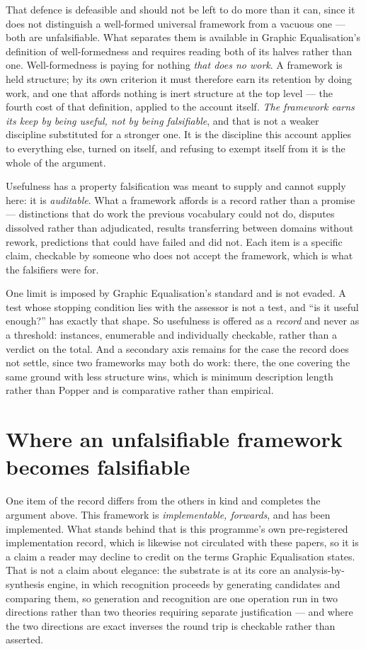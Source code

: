 \documentclass[11pt,a4paper]{article}
\begin{document}
That defence is defeasible and should not be left to do more than it can, since it does not
distinguish a well-formed universal framework from a vacuous one --- both are unfalsifiable. What
separates them is available in Graphic Equalisation's definition of well-formedness and requires reading both of its
halves rather than one. Well-formedness is paying for nothing \emph{that does no work}. A framework is
held structure; by its own criterion it must therefore earn its retention by doing work, and one that
affords nothing is inert structure at the top level --- the fourth cost of that definition, applied to
the account itself. \emph{The framework earns its keep by being useful, not by being falsifiable}, and
that is not a weaker discipline substituted for a stronger one. It is the discipline this account
applies to everything else, turned on itself, and refusing to exempt itself from it is the whole of
the argument.

Usefulness has a property falsification was meant to supply and cannot supply here: it is
\emph{auditable}. What a framework affords is a record rather than a promise --- distinctions that do
work the previous vocabulary could not do, disputes dissolved rather than adjudicated, results
transferring between domains without rework, predictions that could have failed and did not. Each item
is a specific claim, checkable by someone who does not accept the framework, which is what the
falsifiers were for.

One limit is imposed by Graphic Equalisation's standard and is not evaded. A test whose stopping condition
lies with the assessor is not a test, and ``is it useful enough?'' has exactly that shape. So
usefulness is offered as a \emph{record} and never as a threshold: instances, enumerable and
individually checkable, rather than a verdict on the total. And a secondary axis remains for the case
the record does not settle, since two frameworks may both do work: there, the one covering the same
ground with less structure wins, which is minimum description length rather than Popper and is
comparative rather than empirical.

\section{Where an unfalsifiable framework becomes falsifiable}\label{sec:implementable}
One item of the record differs from
the others in kind and completes the argument above. This framework is \emph{implementable, forwards},
and has been implemented. What stands behind that is this programme's own pre-registered
implementation record, which is likewise not circulated with these papers, so it is a claim a reader
may decline to credit on the terms Graphic Equalisation states. That is not a claim about elegance: the
substrate is at its core an analysis-by-synthesis engine, in which recognition proceeds by generating
candidates and comparing them, so generation and recognition are one operation run in two directions
rather than two theories requiring separate justification --- and where the two directions are exact
inverses the round trip is checkable rather than asserted.
\end{document}
